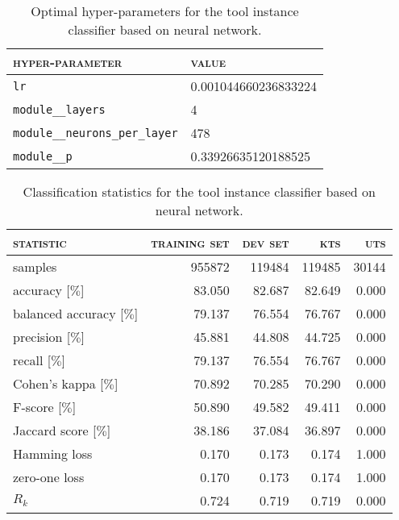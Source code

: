 \begin{table}[H]
	\centering
	\begin{tabular}{ll}
		\toprule
		\textsc{hyper-parameter} & \textsc{value}\\
		\midrule
		\verb|lr| & 0.001044660236833224\\
		\verb|module__layers| & 4\\
		\verb|module__neurons_per_layer| & 478\\
		\verb|module__p| & 0.33926635120188525\\
		\bottomrule
	\end{tabular}
	\caption{Optimal hyper-parameters for the tool instance classifier based on neural network.}
	\label{tab:hyperparameters_application_long_neural_network}
\end{table}
\begin{table}[H]
	\centering
	\begin{tabular}{lrrrr}
		\toprule
		\textsc{statistic} & \textsc{training set} & \textsc{dev set} & \textsc{kts} & \textsc{uts}\\
		\midrule
		samples & 955872 & 119484 & 119485 & 30144\\
		accuracy [$\%$] & 83.050 & 82.687 & 82.649 & 0.000\\
		balanced accuracy [$\%$] & 79.137 & 76.554 & 76.767 & 0.000\\
		precision [$\%$] & 45.881 & 44.808 & 44.725 & 0.000\\
		recall [$\%$] & 79.137 & 76.554 & 76.767 & 0.000\\
		Cohen’s kappa [$\%$] & 70.892 & 70.285 & 70.290 & 0.000\\
		F-score [$\%$] & 50.890 & 49.582 & 49.411 & 0.000\\
		Jaccard score [$\%$] & 38.186 & 37.084 & 36.897 & 0.000\\
		Hamming loss & 0.170 & 0.173 & 0.174 & 1.000\\
		zero-one loss & 0.170 & 0.173 & 0.174 & 1.000\\
		$R_k$ & 0.724 & 0.719 & 0.719 & 0.000\\
		\bottomrule
	\end{tabular}
	\caption{Classification statistics for the tool instance classifier based on neural network.}
	\label{tab:classification_application_long_neural_network}
\end{table}
